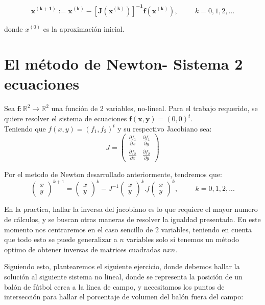\documentclass[10pt,a4paper]{article}
\begin{document}
$$\boldsymbol{x^{(k+1)}:=x^{(k)}-[J(x^{(k)})]^{-1}f(x^{(k)})},\hspace{1cm} k=0,1,2,...$$

donde $x^{(0)}$ es la aproximación inicial. 


\section{El método de Newton- Sistema 2 ecuaciones}

Sea $\boldsymbol{f}:\mathbb{R}^{2}\rightarrow \mathbb{R}^{2}$ una función de 2 variables, no-lineal. Para el trabajo requerido, se quiere resolver el sistema de ecuaciones $\boldsymbol{f(x,y)}=(0,0)^{t}$. \\

Teniendo que $f(x,y)=(f_{1},f_{2})^{t}$ y su respectivo Jacobiano sea: 
$$J=\begin{pmatrix}
 \frac{\partial f_{1}}{\partial x} & \frac{\partial f_{1}}{\partial y}\\ 
 \frac{\partial f_{2}}{\partial x} & \frac{\partial f_{2}}{\partial y} 
\end{pmatrix}
$$



Por el metodo de Newton desarrollado anteriormente, tendremos que: 
$$\begin{pmatrix} x \\ y \end{pmatrix}^{k+1} = \begin{pmatrix} x \\ y \end{pmatrix}^{k}-J^{-1}\begin{pmatrix} x \\ y \end{pmatrix}^{k}.f\begin{pmatrix} x \\ y \end{pmatrix}^{k}, \hspace{1cm} k=0,1,2,...$$

En la practica, hallar la inversa del jacobiano es lo que requiere el mayor numero de cálculos, y se buscan otras maneras de resolver la igualdad presentada. En este momento nos centraremos en el caso sencillo de $2$ variables, teniendo en cuenta que todo esto se puede generalizar a $n$ variables solo si tenemos un método optimo de obtener inversas de matrices cuadradas $nxn$.

Siguiendo esto, plantearemos el siguiente ejercicio, donde debemos hallar la solución al siguiente sistema no lineal, donde se representa la posición de un balón de fútbol cerca a la linea de campo, y necesitamos los puntos de intersección para hallar el porcentaje de volumen del balón fuera del campo: 
\end{document}
